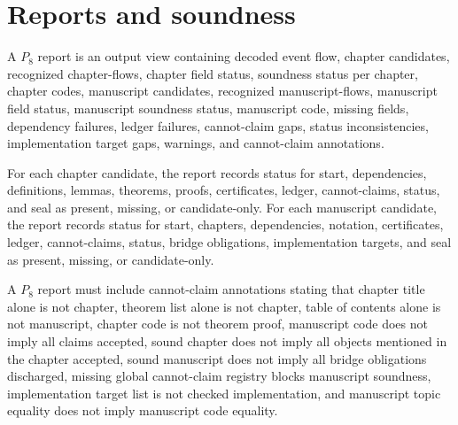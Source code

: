 \section{Reports and soundness}
\label{sec:chapter-manuscript-reports-soundness}

\begin{definition}[$P_8$ report]
\label{def:chapter-manuscript-p8-report}
A $P_8$ report is an output view containing decoded event flow, chapter candidates, recognized chapter-flows, chapter field status, soundness status per chapter, chapter codes, manuscript candidates, recognized manuscript-flows, manuscript field status, manuscript soundness status, manuscript code, missing fields, dependency failures, ledger failures, cannot-claim gaps, status inconsistencies, implementation target gaps, warnings, and cannot-claim annotations.
\end{definition}

\begin{definition}
\label{def:chapter-manuscript-field-status}
For each chapter candidate, the report records status for start, dependencies, definitions, lemmas, theorems, proofs, certificates, ledger, cannot-claims, status, and seal as present, missing, or candidate-only. For each manuscript candidate, the report records status for start, chapters, dependencies, notation, certificates, ledger, cannot-claims, status, bridge obligations, implementation targets, and seal as present, missing, or candidate-only.
\end{definition}

\begin{definition}
\label{def:chapter-manuscript-cannot-claims}
A $P_8$ report must include cannot-claim annotations stating that chapter title alone is not chapter, theorem list alone is not chapter, table of contents alone is not manuscript, chapter code is not theorem proof, manuscript code does not imply all claims accepted, sound chapter does not imply all objects mentioned in the chapter accepted, sound manuscript does not imply all bridge obligations discharged, missing global cannot-claim registry blocks manuscript soundness, implementation target list is not checked implementation, and manuscript topic equality does not imply manuscript code equality.
\end{definition}

